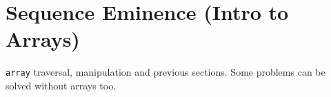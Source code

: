\clearpage
\section{Sequence Eminence (Intro to Arrays)}{\label{sec:sequences}}
\begin{topics}
\verb!array! traversal, manipulation and previous sections. Some problems can be solved without arrays too.
\end{topics}





